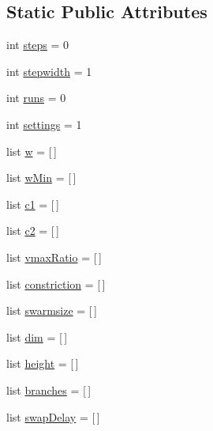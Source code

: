 \subsection*{Static Public Attributes}
\begin{CompactItemize}
\item 
int \hyperlink{classpsoParameter_1_1PsoParameter2_11a11fb8299262f5113acfd966cfdc2e}{steps} = 0
\item 
int \hyperlink{classpsoParameter_1_1PsoParameter2_7e4fe54c8a7efd2d6879dbfe0a6842cb}{stepwidth} = 1
\item 
int \hyperlink{classpsoParameter_1_1PsoParameter2_45f9612c3ab360e09244276533edbae1}{runs} = 0
\item 
int \hyperlink{classpsoParameter_1_1PsoParameter2_e431bfb3b524d8b44567dc702aee7525}{settings} = 1
\item 
list \hyperlink{classpsoParameter_1_1PsoParameter2_e2641efe2ff06d2f414d13277ca7081b}{w} = \mbox{[}$\,$\mbox{]}
\item 
list \hyperlink{classpsoParameter_1_1PsoParameter2_0b31205f85609e145453c3abb8769b96}{wMin} = \mbox{[}$\,$\mbox{]}
\item 
list \hyperlink{classpsoParameter_1_1PsoParameter2_fbccaea08c92f504e3439eacc381f487}{c1} = \mbox{[}$\,$\mbox{]}
\item 
list \hyperlink{classpsoParameter_1_1PsoParameter2_bc61be08b412145b3001da35a5aec02b}{c2} = \mbox{[}$\,$\mbox{]}
\item 
list \hyperlink{classpsoParameter_1_1PsoParameter2_e5c1b92c158ea8dae6ecd427d58c275e}{vmaxRatio} = \mbox{[}$\,$\mbox{]}
\item 
list \hyperlink{classpsoParameter_1_1PsoParameter2_290fa8cb458b722a53efe913cedb7257}{constriction} = \mbox{[}$\,$\mbox{]}
\item 
list \hyperlink{classpsoParameter_1_1PsoParameter2_4924bdb258f2c13046898cb4fba7fe58}{swarmsize} = \mbox{[}$\,$\mbox{]}
\item 
list \hyperlink{classpsoParameter_1_1PsoParameter2_99591471bfeadbac864e8f4d538aac66}{dim} = \mbox{[}$\,$\mbox{]}
\item 
list \hyperlink{classpsoParameter_1_1PsoParameter2_04b2fc2ad00079eb892b6eb94d03f3a1}{height} = \mbox{[}$\,$\mbox{]}
\item 
list \hyperlink{classpsoParameter_1_1PsoParameter2_eeaf22adfcb2146acc4f99957898dbdc}{branches} = \mbox{[}$\,$\mbox{]}
\item 
list \hyperlink{classpsoParameter_1_1PsoParameter2_c49482c7600bb210fad9e06eca63eedb}{swapDelay} = \mbox{[}$\,$\mbox{]}

\end{CompactItemize}
